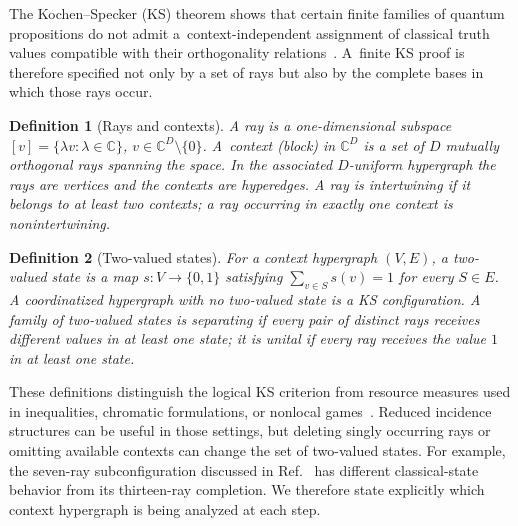 \documentclass[%
  reprint,
  superscriptaddress,
  showpacs,
  showkeys,
  amsmath,amssymb,
  pra,
  longbibliography,
  floatfix,
  x11names
]{revtex4-2}
\newenvironment{revision}{\begingroup\color{revisionblue}}{\endgroup}
\newtheorem{definition}{Definition}
\begin{document}
\begin{revision}
The Kochen--Specker (KS) theorem shows that certain finite families of quantum propositions do not admit a~context-independent assignment of classical truth values compatible with their orthogonality relations~\cite{kochen1}.  A~finite KS proof is therefore specified not only by a set of rays but also by the complete bases in which those rays occur.

\begin{definition}[Rays and contexts]
\label{def:contexts}
A \emph{ray} is a one-dimensional subspace $[v]=\{\lambda v:\lambda\in\mathbb{C}%
\}$, $v \in \mathbb{C}^D \setminus\{0\}$. %
A~\emph{context} (block) in $\mathbb{C}^D$ is a set of $D$ mutually orthogonal rays spanning the space.  In the associated $D$-uniform hypergraph the rays are vertices and the contexts are hyperedges.  A ray is \emph{intertwining} if it belongs to at least two contexts; a ray occurring in exactly one context is nonintertwining.
\end{definition}

\begin{definition}[Two-valued states]
\label{def:states}
For a context hypergraph $(V,E)$, a two-valued state is a map $s:V\to\{0,1\}$ satisfying $\sum_{v\in S}s(v)=1$ for every $S\in E$.  %
A coordinatized hypergraph with no two-valued state is a KS configuration.  A family of two-valued states is \emph{separating} if every pair of distinct rays receives different values in at least one state; it is \emph{unital} if every ray receives the value $1$ in at least one state.
\end{definition}

These definitions distinguish the logical KS criterion from resource measures used in inequalities, chromatic formulations, or nonlocal games~\cite{cabello:210401,2024-cabello-trandafir0,svozil-2025-color}.  Reduced incidence structures can be useful in those settings, but deleting singly occurring rays or omitting available contexts can change the set of two-valued states.  For example, the seven-ray subconfiguration discussed in Ref.~\cite[Fig.~6(a)]{pavicic-2025} has different classical-state behavior from its thirteen-ray completion.  We therefore state explicitly which context hypergraph is being analyzed at each step.


\end{revision}
\end{document}
